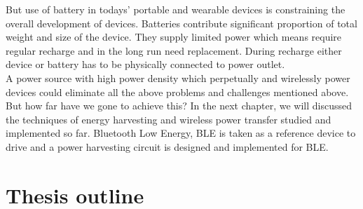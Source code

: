 \documentclass[UKenglish]{ifimaster}  %
\begin{document}
But use of battery in todays'  portable and wearable devices is constraining the overall development of devices. Batteries contribute significant proportion of total weight and size of the device. They supply limited 
power which means require regular recharge and in the long run need replacement. During recharge either device or 
battery has to be physically connected to power outlet. \\

A power source with high power density which perpetually and wirelessly power devices could eliminate 
all the above problems and challenges mentioned above. But how 
far have we gone to achieve this? In the next chapter, we will discussed the techniques of energy harvesting and 
wireless power transfer studied and implemented so far. Bluetooth Low Energy, BLE is taken as a 
reference device to drive and a power harvesting circuit is designed and implemented for BLE. \\


\section{Thesis outline}
\end{document}

